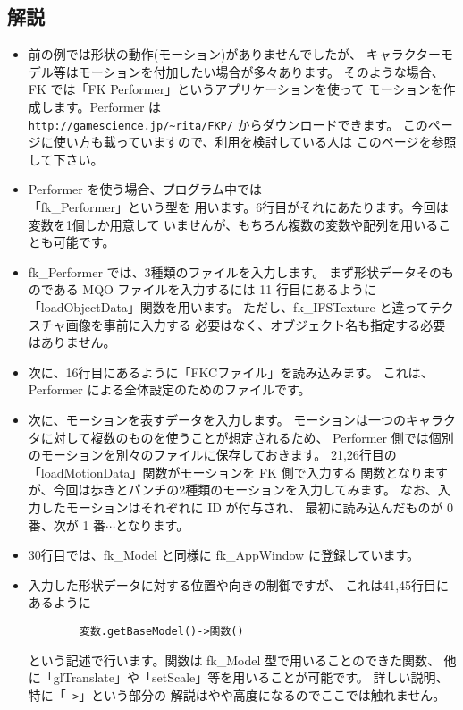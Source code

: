 \subsection*{解説}
\begin{itemize}
 \item 前の例では形状の動作(モーション)がありませんでしたが、
	キャラクターモデル等はモーションを付加したい場合が多々あります。
	そのような場合、FK では「FK Performer」というアプリケーションを使って
	モーションを作成します。Performer は\\
	\verb+http://gamescience.jp/~rita/FKP/+ からダウンロードできます。
	このページに使い方も載っていますので、利用を検討している人は
	このページを参照して下さい。

 \item Performer を使う場合、プログラム中では\\
	「fk\_Performer」という型を
	用います。6行目がそれにあたります。今回は変数を1個しか用意して
	いませんが、もちろん複数の変数や配列を用いることも可能です。

 \item fk\_Performer では、3種類のファイルを入力します。
	まず形状データそのものである MQO ファイルを入力するには
	11 行目にあるように「loadObjectData」関数を用います。
	ただし、fk\_IFSTexture と違ってテクスチャ画像を事前に入力する
	必要はなく、オブジェクト名も指定する必要はありません。

 \item 次に、16行目にあるように「FKCファイル」を読み込みます。
	これは、Performer による全体設定のためのファイルです。

 \item 次に、モーションを表すデータを入力します。
	モーションは一つのキャラクタに対して複数のものを使うことが想定されるため、
	Performer 側では個別のモーションを別々のファイルに保存しておきます。
	21,26行目の「loadMotionData」関数がモーションを FK 側で入力する
	関数となりますが、今回は歩きとパンチの2種類のモーションを入力してみます。
	なお、入力したモーションはそれぞれに ID が付与され、
	最初に読み込んだものが 0 番、次が 1 番\(\cdots\)となります。

 \item 30行目では、fk\_Model と同様に fk\_AppWindow に登録しています。

 \item 入力した形状データに対する位置や向きの制御ですが、
	これは41,45行目にあるように
	\begin{screen}
	\begin{verbatim}
	    変数.getBaseModel()->関数()
	\end{verbatim}
	\end{screen}
	という記述で行います。関数は fk\_Model 型で用いることのできた関数、
	他に「glTranslate」や「setScale」等を用いることが可能です。
	詳しい説明、特に「\verb+->+」という部分の
	解説はやや高度になるのでここでは触れません。


\end{itemize}
